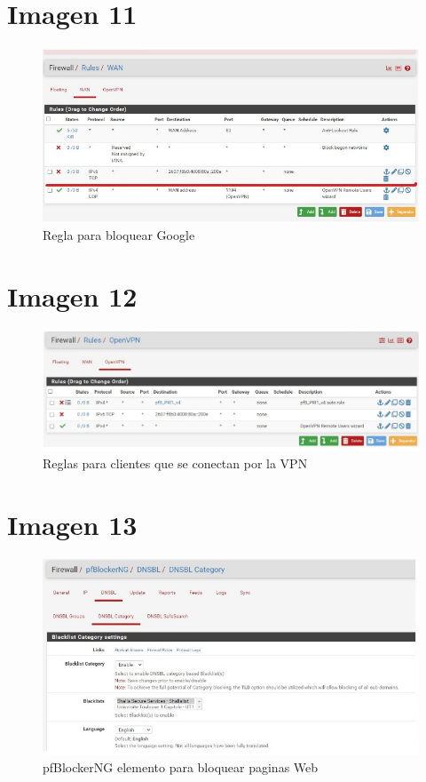 \documentclass[12pt,letterspaper]{report}
\begin{document}
\chapter*{Imagen 11}
\vspace {0.3cm}
\begin{figure}[htb]
\centering
\includegraphics[scale=0.5]{Img11.jpg}
\caption{{Regla para bloquear Google}}
\end{figure}\par
\vspace {0.1cm}


\chapter*{Imagen 12}
\vspace {0.3cm}
\begin{figure}[htb]
\centering
\includegraphics[scale=0.5]{Img12.jpg}
\caption{{Reglas para clientes que se conectan por la VPN}}
\end{figure}\par
\vspace {0.1cm}


\chapter*{Imagen 13}
\vspace {0.3cm}
\begin{figure}[htb]
\centering
\includegraphics[scale=0.5]{Img13.jpg}
\caption{{pfBlockerNG elemento para bloquear paginas Web}}
\end{figure}\par
\vspace {0.1cm}
\end{document}
